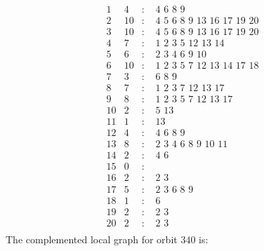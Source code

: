 \documentclass[12pt]{article}
\begin{document}
\begin{equation*}
\begin{array}{rrcl}
1&4&:&\,\,4\,\,6\,\,8\,\,9\\
2&10&:&\,\,4\,\,5\,\,6\,\,8\,\,9\,\,13\,\,16\,\,17\,\,19\,\,20\\
3&10&:&\,\,4\,\,5\,\,6\,\,8\,\,9\,\,13\,\,16\,\,17\,\,19\,\,20\\
4&7&:&\,\,1\,\,2\,\,3\,\,5\,\,12\,\,13\,\,14\\
5&6&:&\,\,2\,\,3\,\,4\,\,6\,\,9\,\,10\\
6&10&:&\,\,1\,\,2\,\,3\,\,5\,\,7\,\,12\,\,13\,\,14\,\,17\,\,18\\
7&3&:&\,\,6\,\,8\,\,9\\
8&7&:&\,\,1\,\,2\,\,3\,\,7\,\,12\,\,13\,\,17\\
9&8&:&\,\,1\,\,2\,\,3\,\,5\,\,7\,\,12\,\,13\,\,17\\
10&2&:&\,\,5\,\,13\\
11&1&:&\,\,13\\
12&4&:&\,\,4\,\,6\,\,8\,\,9\\
13&8&:&\,\,2\,\,3\,\,4\,\,6\,\,8\,\,9\,\,10\,\,11\\
14&2&:&\,\,4\,\,6\\
15&0&:&\\
16&2&:&\,\,2\,\,3\\
17&5&:&\,\,2\,\,3\,\,6\,\,8\,\,9\\
18&1&:&\,\,6\\
19&2&:&\,\,2\,\,3\\
20&2&:&\,\,2\,\,3\\
\end{array}
\end{equation*}
The complemented local graph for orbit $340$ is:
\end{document}
